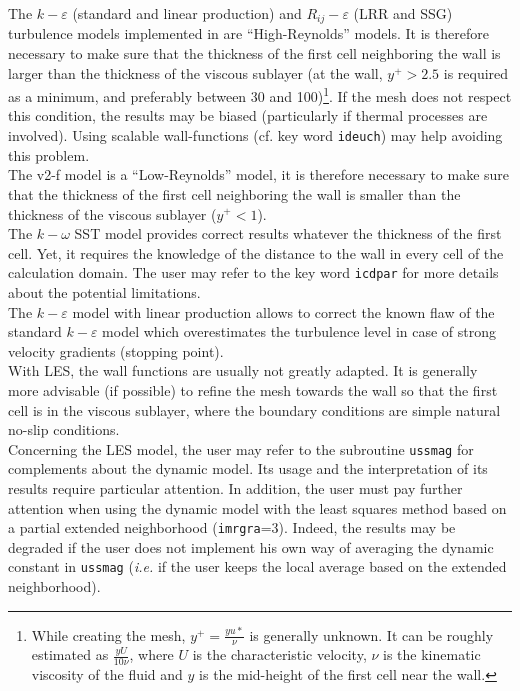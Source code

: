 The $k-\varepsilon$ (standard and linear production) and $R_{ij}-\varepsilon$
(LRR and SSG) turbulence
models implemented in \CS are ``High-Reynolds'' models. It is therefore
necessary to make sure that the thickness of the first cell neighboring
the wall is larger than the thickness of the viscous sublayer (at the
wall, $y^+>2.5$ is required as a minimum, and preferably between 30 and
100)\footnote{While creating the mesh, $y^+=\frac{yu*}{\nu}$ is
generally unknown. It can be roughly estimated as $\frac{yU}{10\nu}$, where
$U$ is the characteristic velocity, $\nu$ is the kinematic viscosity of the fluid
 and $y$ is the mid-height of the first cell near the wall.}. If the mesh does
 not respect this condition, the results may be biased
(particularly if thermal processes are involved). Using scalable wall-functions
(cf. key word {\tt ideuch}) may help avoiding this problem.\\
The v2-f model is a ``Low-Reynolds'' model, it is therefore necessary to
make sure that the thickness of the first cell neighboring the wall is
smaller than the thickness of the viscous sublayer ($y^+<1$).\\
The $k-\omega$ SST model provides correct results whatever the thickness of the first cell.
Yet, it requires the knowledge of the distance to the wall in every
cell of the calculation domain. The user may refer to the key word
{\tt icdpar} for more details about the potential limitations.\\
The $k-\varepsilon$ model with linear production allows to correct the
known flaw of the standard $k-\varepsilon$ model which overestimates the
turbulence level in case of strong velocity gradients (stopping point).\\
With LES, the wall functions are usually not greatly adapted. It is generally more advisable
(if possible) to refine the mesh towards the wall so that the first cell is in the
viscous sublayer, where the boundary conditions are simple natural no-slip conditions.\\
Concerning the LES model, the user may refer to the subroutine
\texttt{ussmag} for complements about the dynamic model. Its usage
and the interpretation of its results require particular attention.
In addition, the user must pay further attention when using the dynamic
model with the least squares method based on a partial extended
neighborhood ({\tt imrgra}=3). Indeed, the results may be degraded if the user
does not implement his own way of averaging the dynamic constant in
\texttt{ussmag} (\textit{i.e.} if the user keeps the local average based
on the extended neighborhood).\\


